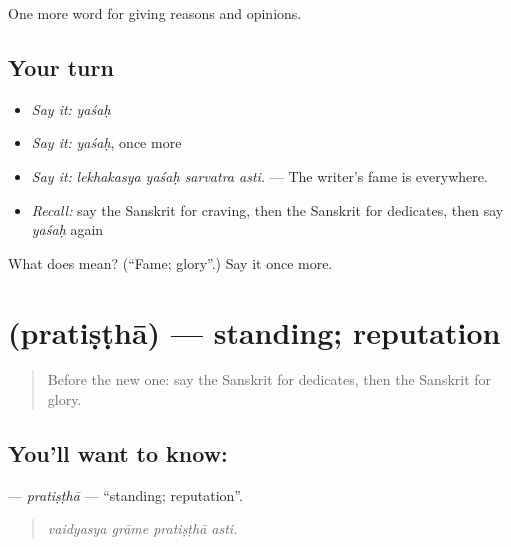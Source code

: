 \begin{grammarlens}[title={What you've built}]
One more word for giving reasons and opinions.
\end{grammarlens}

\subsection*{Your turn}
\begin{itemize}
\raggedright
  \item \emph{Say it:} \emph{yaśaḥ}
  \item \emph{Say it:} \emph{yaśaḥ}, once more
  \item \emph{Say it:} \emph{lekhakasya yaśaḥ sarvatra asti.} — The writer's fame is everywhere.
  \item \emph{Recall:} say the Sanskrit for craving, then the Sanskrit for dedicates, then say \emph{yaśaḥ} again
\end{itemize}

\begin{tcolorbox}[breakable,colback=teal!4,colframe=teal!35!black,title={Before you move on}]
What does  mean? (\textquotedblleft{}Fame; glory\textquotedblright{}.) Say it once more.
\end{tcolorbox}
\section[\texorpdfstring{\sk{प्रतिष्ठा} (pratiṣṭhā)}{प्रतिष्ठा (pratiṣṭhā)}]{ (pratiṣṭhā) — standing; reputation}

\label{lesson:SA-C360-pratistha}



\begin{quote}
Before the new one: say the Sanskrit for dedicates, then the Sanskrit for glory.
\end{quote}

\subsection*{You'll want to know: }
\textbf{} — \emph{pratiṣṭhā} — \textquotedblleft{}standing; reputation\textquotedblright{}.

\begin{quote}
   
\end{quote}

\begin{quote}
\emph{vaidyasya grāme pratiṣṭhā asti.}
\end{quote}

